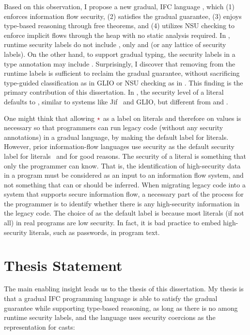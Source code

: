 Based on this observation, I propose a new gradual, IFC language \Surface, which
(1) enforces information flow security, (2) satisfies the gradual guarantee, (3)
enjoys type-based reasoning through free theorems, and (4) utilizes NSU checking
to enforce implicit flows through the heap with no static analysis required. In
\Surface, runtime security labels do not include \unk, only \low and \high (or
any lattice of security labels). On the other hand, to support gradual typing,
the security labels in a type annotation may include \unk. Surprisingly, I
discover that removing \unk from the runtime labels is sufficient to reclaim the
gradual guarantee, without sacrificing type-guided classification as in GLIO or
NSU checking as in \WHILEG. This finding is the primary contribution of this
dissertation. In \Surface, the security level of a literal defaults to \low,
similar to systems like Jif~\parencite{Myers:2006aa} and GLIO, but different
from \GSLRef and \WHILEG.

One might think that allowing $\unk$ as a label on literals and therefore on
values is necessary so that programmers can run legacy code (without any
security annotations) in a gradual language, by making \unk the default label
for literals. However, prior information-flow languages use \low security as the
default security label for literals~\parencite{Myers:2006aa} and for good
reasons. The security of a literal is something that only the programmer can
know. That is, the identification of high-security data in a program must be
considered as an input to an information flow system, and not something that can
or should be inferred. When migrating legacy code into a system that supports
secure information flow, a necessary part of the process for the programmer is
to identify whether there is any high-security information in the legacy code.
The choice of \low as the default label is because most literals (if not all) in
real programs are low security. In fact, it is bad practice to embed
high-security literals, such as passwords, in program text.

\section{Thesis Statement}

The main enabling insight leads us to the thesis of this dissertation. My thesis
is that a gradual IFC programming language is able to satisfy the gradual
guarantee while supporting type-based reasoning, as long as there is no \unk
among runtime security labels, and the language uses security coercions as the
representation for casts:

